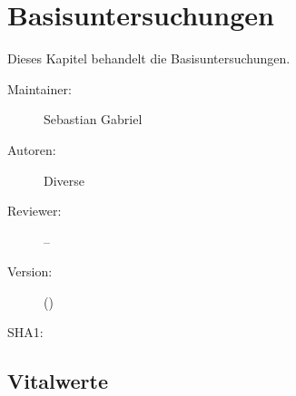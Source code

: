 % 
\def\ChapterCode{BAU}
\chapter
[Basisuntersuchungen]
{Basisuntersuchungen}
\label{chp:BAU}

\ChapterIntro
{%
\noindent Dieses Kapitel behandelt die Basisuntersuchungen.
}
{%
\begin{description}
  \item[Maintainer:] Sebastian Gabriel
  \item[Autoren:] Diverse
  \item[Reviewer:] --
  \item[Version:] {\DocVersion} ({\DocVersionInfo})
  \item[SHA1:] {\DocGitCommit}
\end{description}

{\TxTeilkapitelAASS}
}






\clearpage %
% 
% 
% 
% 
% 
% 





\section{Vitalwerte}
\label{topic:vitalwerte}

